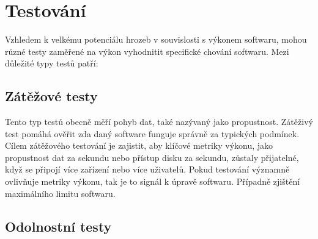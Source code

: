 \section{Testování}

Vzhledem k velkému potenciálu hrozeb v souvislosti s výkonem softwaru, mohou různé testy zaměřené na výkon vyhodnitit specifické chování softwaru. Mezi důležité typy testů patří:

\subsection*{Zátěžové testy}

Tento typ testů obecně měří pohyb dat, také nazývaný jako propustnost. Zátěživý test pomáhá ověřit zda daný software funguje správně za typických podmínek. Cílem zátěžového testování je zajistit,
aby klíčové metriky výkonu, jako propustnost dat za sekundu nebo přístup disku za sekundu, zůstaly přijatelné, když se připojí více zařízení nebo více uživatelů. Pokud testování významně
ovlivňuje metriky výkonu, tak je to signál k úpravě softwaru. Případně zjištění maximálního limitu softwaru.

\subsection*{Odolnostní testy}

